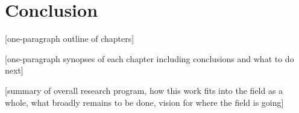 \chapter*{Conclusion}

[one-paragraph outline of chapters]

[one-paragraph synopses of each chapter including conclusions and what to do next]

[summary of overall research program, how this work fits into the field as a whole, what broadly remains to be done, vision for where the field is going]










